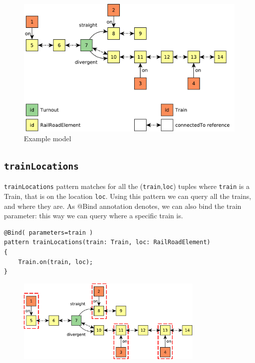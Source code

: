 \begin{figure}[H]
	\begin{center}
		\includegraphics[width=\textwidth]{figures/query-example-model.pdf}
		\caption{Example model}
		\label{fig:query-example-model}
	\end{center}
\end{figure}

\subsection{\texttt{trainLocations}}
\begin{minipage}{\textwidth}

\texttt{trainLocations} pattern matches for all the (\texttt{train},\texttt{loc}) tuples where \texttt{train} is a Train, that is on the location \texttt{loc}.
Using this pattern we can query all the trains, and where they are.
As @Bind annotation denotes, we can also bind the train parameter: this way we can query where a specific train is.
\begin{lstlisting}[language = vql]
@Bind( parameters=train )
pattern trainLocations(train: Train, loc: RailRoadElement)
{
	Train.on(train, loc);
}
\end{lstlisting}

\begin{figure}[H]
	\begin{center}
		\includegraphics[width=0.8\textwidth]{figures/query-example-model-trainloc.pdf}
	\end{center}
\end{figure}

\end{minipage}







